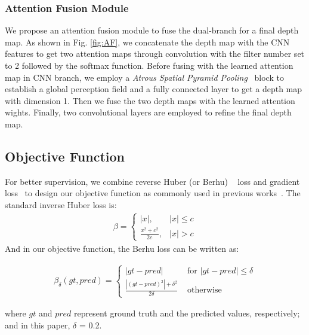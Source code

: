 \documentclass[10pt,times,mathptm,psfig,twocolumn,journals]{IEEEtran}
\begin{document}
\subsubsection{Attention Fusion Module}
\label{AF}
We propose an attention fusion module to fuse the dual-branch for a final depth map. As shown in Fig. \ref{fig:AF}, we concatenate the depth map with the CNN features to get two attention maps through convolution with the filter number set to 2 followed by the softmax function. Before fusing with the learned attention map in CNN branch, we employ a \textit{Atrous Spatial Pyramid Pooling}~\cite{chen2014semantic} block to establish a global perception field and a fully connected layer to get a depth map with dimension 1. Then we fuse the two depth maps with the learned attention wights. Finally, two convolutional layers are employed to refine the final depth map.  \subsection{Objective Function}
\label{objective}
For better supervision, we combine reverse Huber (or Berhu) ~\cite{laina2016deeper,2020BiFuse,Pintore_2021_CVPR, Jiang_2021} loss and gradient loss~\cite{shen2021distortion} to design our objective function as commonly used in previous works~\cite{shen2021distortion,Pintore_2021_CVPR}. The standard inverse Huber loss is:
\begin{eqnarray}
\beta=\left
\{\begin{array}{ll}
|x|, & |x| \leq c \\
\frac{x^{2}+c^{2}}{2 c}, & |x|>c
\end{array} \right.
\end{eqnarray}
And in our objective function, the Berhu loss can be written as:
\begin{small}
\begin{eqnarray}
\beta_{\delta}(gt, pred)=\left\{\begin{array}{ll}
|gt-pred| & \text { for }|gt-pred| \leq \delta \\
\frac{|(gt-pred)^{2}|+ \delta^{2}}{2\delta} & \text { otherwise }
\end{array}\right.
\end{eqnarray}
\end{small}
where $gt$ and $pred$ represent ground truth and the predicted values, respectively; and in this paper, $\delta$ = 0.2.
\end{document}
